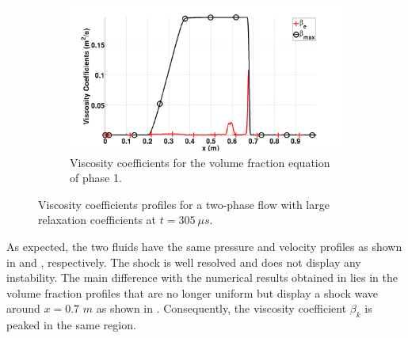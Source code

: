 \documentclass[preprint,10pt]{elsarticle}
\begin{document}
\begin{figure}[H]
        \begin{subfigure}[b]{0.495\textwidth}
                \centering
                \includegraphics[width=\textwidth]{figures/relaxation_phase_1_beta.png}
                \caption{Viscosity coefficients for the volume fraction equation of phase 1.}
                \label{fig:inf-rel-beta}
        \end{subfigure}        
        \caption{Viscosity coefficients profiles for a two-phase flow with large relaxation coefficients at $t=305 \ \mu s$.}\label{fig:inf-rel-visc-coeff}
\end{figure}
%
As expected, the two fluids have the same pressure and velocity profiles as shown in  and , respectively. The shock is well resolved and does not display any instability. The main difference with the numerical results obtained in  lies in the volume fraction profiles that are no longer uniform but display a shock wave around $x=0.7$ $m$ as shown in . Consequently, the viscosity coefficient $\beta_k$ is peaked in the same region.  
\end{document}
